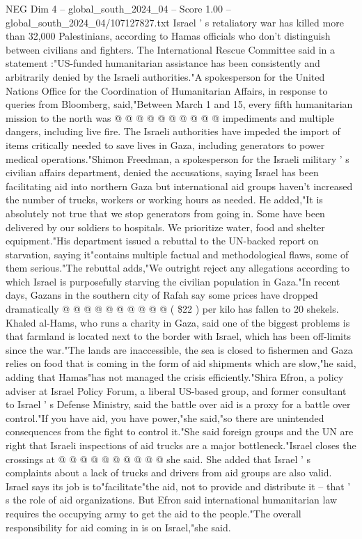 \begin{textsample}{NEG Dim 4 – global\_south\_2024\_04 – Score 1.00 – global\_south\_2024\_04/107127827.txt}
Israel ' s retaliatory war has killed more than 32,000 Palestinians, according to Hamas officials who don't distinguish between civilians and fighters.
The International Rescue Committee said in a statement :"US-funded humanitarian assistance has been consistently and arbitrarily denied by the Israeli authorities."A spokesperson for the United Nations Office for the Coordination of Humanitarian Affairs, in response to queries from Bloomberg, said,"Between March 1 and 15, every fifth humanitarian mission to the north was @ @ @ @ @ @ @ @ @ @ impediments and multiple dangers, including live fire.
The Israeli authorities have impeded the import of items critically needed to save lives in Gaza, including generators to power medical operations."Shimon Freedman, a spokesperson for the Israeli military ' s civilian affairs department, denied the accusations, saying Israel has been facilitating aid into northern Gaza but international aid groups haven't increased the number of trucks, workers or working hours as needed.
He added,"It is absolutely not true that we stop generators from going in.
Some have been delivered by our soldiers to hospitals.
We prioritize water, food and shelter equipment."His department issued a rebuttal to the UN-backed report on starvation, saying it"contains multiple factual and methodological flaws, some of them serious."The rebuttal adds,"We outright reject any allegations according to which Israel is purposefully starving the civilian population in Gaza."In recent days, Gazans in the southern city of Rafah say some prices have dropped dramatically @ @ @ @ @ @ @ @ @ @ ( \$22 ) per kilo has fallen to 20 shekels.
Khaled al-Hams, who runs a charity in Gaza, said one of the biggest problems is that farmland is located next to the border with Israel, which has been off-limits since the war."The lands are inaccessible, the sea is closed to fishermen and Gaza relies on food that is coming in the form of aid shipments which are slow,"he said, adding that Hamas"has not managed the crisis efficiently."Shira Efron, a policy adviser at Israel Policy Forum, a liberal US-based group, and former consultant to Israel ' s Defense Ministry, said the battle over aid is a proxy for a battle over control."If you have aid, you have power,"she said,"so there are unintended consequences from the fight to control it."She said foreign groups and the UN are right that Israeli inspections of aid trucks are a major bottleneck."Israel closes the crossings at @ @ @ @ @ @ @ @ @ @ she said.
She added that Israel ' s complaints about a lack of trucks and drivers from aid groups are also valid.
Israel says its job is to"facilitate"the aid, not to provide and distribute it -- that ' s the role of aid organizations.
But Efron said international humanitarian law requires the occupying army to get the aid to the people."The overall responsibility for aid coming in is on Israel,"she said.

\end{textsample}
